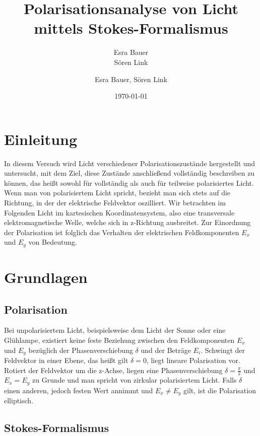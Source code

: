 \documentclass[bigchapter,colorback,accentcolor=tud4b,linedtoc,11pt]{tudreport}
\title{Polarisationsanalyse von Licht mittels Stokes-Formalismus}
\subtitle{Esra Bauer  \\Sören Link}
\author{Esra Bauer, Sören Link}
\date{\today}
\begin{document}

\maketitle

\tableofcontents


\chapter{Einleitung}

In diesem Versuch wird Licht verschiedener Polarisationszustände hergestellt und untersucht, mit dem Ziel, diese Zustände anschließend vollständig beschreiben zu können, das heißt sowohl für vollständig als auch für teilweise polarisiertes Licht. Wenn man von polarisiertem Licht spricht, bezieht man sich stets auf die Richtung, in der der elektrische Feldvektor oszilliert. Wir betrachten im Folgenden Licht im kartesischen Koordinatensystem, also eine transversale elektromagnetische Welle, welche sich in z-Richtung ausbreitet. Zur Einordnung der Polarisation ist folglich das Verhalten der elektrischen Feldkomponenten $E_x$ und $E_y$ von Bedeutung.

\chapter{Grundlagen}
\section{Polarisation}

Bei unpolarisiertem Licht, beispielsweise dem Licht der Sonne oder eine Glühlampe, existiert keine feste Beziehung zwischen den Feldkomponenten $E_x$ und $E_y$ bezüglich der Phasenverschiebung $\delta$ und der Beträge $E_{i}$. Schwingt der Feldvektor in einer Ebene, das heißt gilt $\delta=0$, liegt lineare Polarisation vor. Rotiert der Feldvektor um die z-Achse, liegen eine Phasenverschiebung $\delta=\frac{\pi}{2}$ und $E_{x}=E_{y}$ zu Grunde und man spricht von zirkular polarisiertem Licht. Falls $\delta$ einen anderen, jedoch festen Wert annimmt und $E_{x}\neq E_{y}$ gilt, ist die Polarisation elliptisch. 


\section{Stokes-Formalismus}
\end{document}
